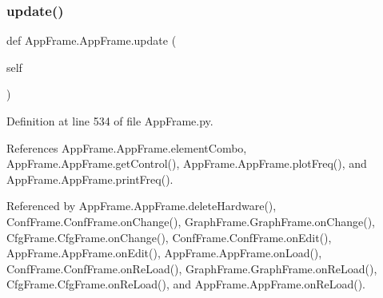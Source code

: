 \subsubsection{\texorpdfstring{update()}{update()}}
{\footnotesize\ttfamily def App\+Frame.\+App\+Frame.\+update (\begin{DoxyParamCaption}\item[{}]{self }\end{DoxyParamCaption})}



Definition at line 534 of file App\+Frame.\+py.



References App\+Frame.\+App\+Frame.\+element\+Combo, App\+Frame.\+App\+Frame.\+get\+Control(), App\+Frame.\+App\+Frame.\+plot\+Freq(), and App\+Frame.\+App\+Frame.\+print\+Freq().



Referenced by App\+Frame.\+App\+Frame.\+delete\+Hardware(), Conf\+Frame.\+Conf\+Frame.\+on\+Change(), Graph\+Frame.\+Graph\+Frame.\+on\+Change(), Cfg\+Frame.\+Cfg\+Frame.\+on\+Change(), Conf\+Frame.\+Conf\+Frame.\+on\+Edit(), App\+Frame.\+App\+Frame.\+on\+Edit(), App\+Frame.\+App\+Frame.\+on\+Load(), Conf\+Frame.\+Conf\+Frame.\+on\+Re\+Load(), Graph\+Frame.\+Graph\+Frame.\+on\+Re\+Load(), Cfg\+Frame.\+Cfg\+Frame.\+on\+Re\+Load(), and App\+Frame.\+App\+Frame.\+on\+Re\+Load().


